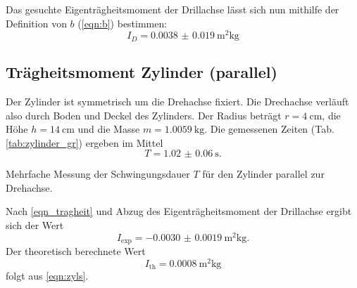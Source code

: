 Das gesuchte Eigenträgheitsmoment der Drillachse lässt sich nun mithilfe der Definition von $b$ (\autoref{eqn:b}) bestimmen:
\begin{equation*}
    I_D = \SI{0.0038(190)}{\metre^2\kg}
\end{equation*}

\FloatBarrier

\subsection{Trägheitsmoment Zylinder (parallel)}
Der Zylinder ist symmetrisch um die Drehachse fixiert.
Die Drechachse verläuft also durch Boden und Deckel des Zylinders.
Der Radius beträgt $r = \SI{4}{\centi\metre}$, die Höhe $h = \SI{14}{\centi\metre}$ und die Masse $m = \SI{1.0059}{\kg}$.
Die gemessenen Zeiten (Tab. \ref{tab:zylinder_gr}) ergeben im Mittel
\begin{equation*}
    T = \SI{1.02(6)}{\second} .
\end{equation*}
\begin{table}
    \centering
    \caption{Mehrfache Messung der Schwingungsdauer $T$ für den Zylinder parallel zur Drehachse.}
    \label{tab:zylinder_gr}
\end{table}
\FloatBarrier
Nach \autoref{eqn_tragheit} und Abzug des Eigenträgheitsmoment der Drillachse ergibt sich der Wert
\begin{equation*}
    I_\text{exp} = \SI{-0.0030(19)}{\metre^2\kg} .
\end{equation*}
Der theoretisch berechnete Wert
\begin{equation*}
    I_\text{th} = \SI{0.0008}{\metre^2\kg}
\end{equation*}
folgt aus \autoref{eqn:zyls}.

